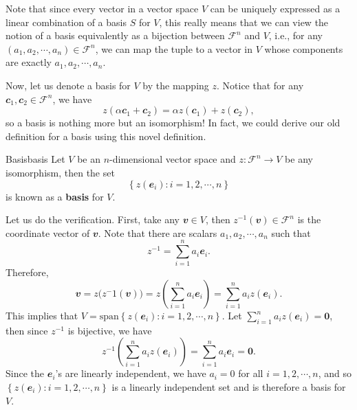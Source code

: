 \documentclass[math, code]{amznotes}
\theoremstyle{remark}
\newcommand{\zero}{\mathbf{0}}
\begin{document}
Note that since every vector in a vector space $V$ can be uniquely expressed as a linear combination of a basis $S$ for $V$, this really means that we can view the notion of a basis equivalently as a bijection between $\mathcal{F}^n$ and $V$, i.e., for any $(a_1, a_2, \cdots, a_n) \in \mathcal{F}^n$, we can map the tuple to a vector in $V$ whose components are exactly $a_1, a_2, \cdots, a_n$.

Now, let us denote a basis for $V$ by the mapping $z$. Notice that for any $\mathbfit{c}_1, \mathbfit{c}_2 \in \mathcal{F}^n$, we have 
\begin{equation*}
    z(\alpha\mathbfit{c}_1 + \mathbfit{c}_2) = \alpha z(\mathbfit{c}_1) + z(\mathbfit{c}_2),
\end{equation*}
so a basis is nothing more but an isomorphism! In fact, we could derive our old definition for a basis using this novel definition.
\begin{dfnbox}{Basis}{basis}
    Let $V$ be an $n$-dimensional vector space and $z \colon \mathcal{F}^n \to V$ be any isomorphism, then the set 
    \begin{equation*}
        \left\{z\left(\mathbfit{e}_i\right) \colon i = 1, 2, \cdots, n\right\}
    \end{equation*}
    is known as a {\color{red} \textbf{basis}} for $V$.
\end{dfnbox}
Let us do the verification. First, take any $\mathbfit{v} \in V$, then $z^{-1}(\mathbfit{v}) \in \mathcal{F}^n$ is the coordinate vector of $\mathbfit{v}$. Note that there are scalars $a_1, a_2, \cdots, a_n$ such that 
\begin{equation*}
    z^{-1} = \sum_{i = 1}^{n}a_i\mathbfit{e}_i.
\end{equation*}
Therefore,
\begin{equation*}
    \mathbfit{v} = z\bigl(z^-1(\mathbfit{v})\bigr) = z\left(\sum_{i = 1}^{n}a_i\mathbfit{e}_i\right) = \sum_{i = 1}^{n}a_iz(\mathbfit{e}_i).
\end{equation*}
This implies that $V = \mathrm{span}\left\{z\left(\mathbfit{e}_i\right) \colon i = 1, 2, \cdots, n\right\}$. Let $\sum_{i = 1}^{n}a_iz(\mathbfit{e}_i) = \zero$, then since $z^{-1}$ is bijective, we have 
\begin{equation*}
    z^{-1}\left(\sum_{i = 1}^{n}a_iz(\mathbfit{e}_i)\right) = \sum_{i = 1}^{n}a_i\mathbfit{e}_i = \zero.
\end{equation*}
Since the $\mathbfit{e}_i$'s are linearly independent, we have $a_i = 0$ for all $i = 1, 2, \cdots, n$, and so $\left\{z\left(\mathbfit{e}_i\right) \colon i = 1, 2, \cdots, n\right\}$ is a linearly independent set and is therefore a basis for $V$.
\end{document}
